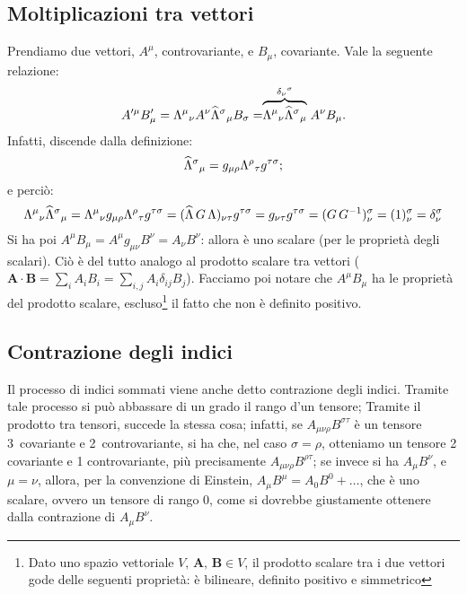 \subsection{ Moltiplicazioni tra vettori}
Prendiamo due vettori, $A^{\mu}$, controvariante, e $B_{\mu}$,
covariante. Vale la seguente relazione:
\begin{equation}
 A'^{\mu} B'_{\mu} = \Lambda^{\mu}{}_{\nu}A^{\nu} 
  \widehat{\Lambda}^{\sigma}{}_{\mu}B_{\sigma} = 
  \stackrel{\delta_{\nu}{}^{\sigma}}{\overbrace{\Lambda^{\mu}{}_{\nu}
  \widehat{\Lambda}^{\sigma}{}_{\mu}}} A^{\nu}B_{\mu}.
\end{equation}
Infatti, discende dalla definizione:
\begin{equation}
 \widehat{\Lambda}^{\sigma}{}_{\mu}=g_{\mu\rho}\Lambda^{\rho}{}_{\tau}g^{\tau\sigma};
\end{equation}
e perci\`o:
\begin{equation}
  \Lambda^{\mu}{}_{\nu} \widehat{\Lambda}^{\sigma}{}_{\mu} = \Lambda^{\mu}{}_{\nu}
   g_{\mu\rho} \Lambda^{\rho}{}_{\tau}g^{\tau\sigma} =
   (\widehat{\Lambda}\,G\,\Lambda)_{\nu\tau} g^{\tau\sigma} = g_{\nu\tau}
   g^{\tau\sigma} = (G\,G^{-1})_{\nu}^{\sigma} = (1)_{\nu}^{\sigma} =
   \delta_{\nu}^{\sigma}
\end{equation}
Si ha poi $A^{\mu} B_{\mu} = A^{\mu} g_{\mu\nu} B^{\nu} = A_{\nu}
B^{\nu}$: allora \`e uno scalare (per le propriet\`a degli
scalari). Ci\`o \`e del tutto analogo al prodotto scalare tra vettori
($\mathbf{A}\cdot\mathbf{B}=\sum_{i}A_i
B_i=\sum_{i,j}A_i\delta_{ij}B_j$).  Facciamo poi notare che
$A^{\mu}B_{\mu}$ ha le propriet\`a del prodotto scalare,
escluso\footnote{Dato uno spazio vettoriale
$V,\,\mathbf{A},\,\mathbf{B}\in V$, il prodotto scalare tra i due
vettori gode delle seguenti propriet\`a: \`e bilineare, definito
positivo e simmetrico} il fatto che non \`e definito positivo.
\subsection{ Contrazione degli indici}
Il processo di indici sommati viene anche detto contrazione degli
indici. Tramite tale processo si pu\`o abbassare di un grado il
rango d'un tensore;
Tramite il prodotto tra tensori, succede la stessa cosa; infatti,
se $A_{\mu\nu\rho} B^{\sigma\tau}$ \`e un tensore 3~covariante e
2~controvariante, si ha che, nel caso $\sigma=\rho$, otteniamo un
tensore 2 covariante e 1 controvariante, pi\`u precisamente
$A_{\mu\nu\rho} B^{\rho\tau}$; se invece si ha $A_{\mu} B^{\nu}$, e
$\mu = \nu$, allora, per la convenzione di Einstein,
$A_{\mu} B^{\mu} = A_0 B^0 + \ldots$, che \`e uno scalare, ovvero un
tensore di rango 0, come si dovrebbe giustamente ottenere dalla
contrazione di $A_{\mu}B^{\nu}$.
